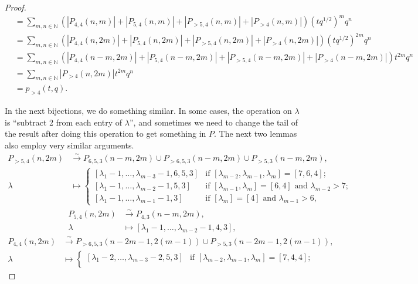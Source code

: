 \documentclass[a4paper, 12pt, reqno]{amsart}
\theoremstyle{remark}
\numberwithin{equation}{subsection}
\begin{document}
\begin{proof}
\begin{align*}
    &= \sum_{m, n \in \mathbb{N}}(|P_{4, 4}(n, m)| + |P_{5, 4}(n, m)| + |P_{>5, 4}(n, m)| + |P_{>4}(n, m)|)(tq^{1/2})^mq^n \\
    &= \sum_{m, n \in \mathbb{N}}(|P_{4, 4}(n, 2m)| + |P_{5, 4}(n, 2m)| + |P_{>5, 4}(n, 2m)| + |P_{>4}(n, 2m)|)(tq^{1/2})^{2m}q^n \\
    &= \sum_{m, n \in \mathbb{N}}(|P_{4, 4}(n - m, 2m)| + |P_{5, 4}(n - m, 2m)| + |P_{>5, 4}(n - m, 2m)| + |P_{>4}(n - m, 2m)|)t^{2m}q^n \\
    &= \sum_{m, n \in \mathbb{N}}|P_{>4}(n, 2m)|t^{2m}q^n \\
    &= p_{>4}(t, q).
  \end{align*}

  In the next bijections, we do something similar.
  In some cases, the operation on $\lambda$ is ``subtract 2 from each entry of $\lambda$'', and sometimes we need to change the tail of the result after doing this operation to get something in $P$.
  The next two lemmas also employ very similar arguments.
  \begin{align*}
    P_{>5, 4}(n, 2m) &\xrightarrow{\sim} P_{6, 5, 3}(n - m, 2m) \cup P_{>6, 5, 3}(n - m, 2m) \cup P_{>5, 3}(n - m, 2m), \\
    \lambda &\mapsto
              \begin{cases}
                [\lambda_1 - 1, \dots, \lambda_{m - 3} - 1, 6, 5, 3] &\text{if }[\lambda_{m - 2}, \lambda_{m - 1}, \lambda_m] = [7, 6, 4]; \\
                [\lambda_1 - 1, \dots, \lambda_{m - 2} - 1, 5, 3] &\text{if }[\lambda_{m - 1}, \lambda_m] = [6, 4]\text{ and }\lambda_{m - 2} > 7; \\
                [\lambda_1 - 1, \dots, \lambda_{m - 1} - 1, 3] &\text{if }[\lambda_m] = [4]\text{ and }\lambda_{m - 1} > 6,
              \end{cases}
  \end{align*}
  \begin{align*}
    P_{5, 4}(n, 2m) &\xrightarrow{\sim} P_{4, 3}(n - m, 2m), \\
    \lambda &\mapsto [\lambda_1 - 1, \dots, \lambda_{m - 2} - 1, 4, 3],
  \end{align*}
  \begin{align*}
    P_{4, 4}(n, 2m) &\xrightarrow{\sim} P_{>6, 5, 3}(n - 2m - 1, 2(m - 1)) \cup P_{>5, 3}(n - 2m - 1, 2(m - 1)), \\
    \lambda &\mapsto
              \begin{cases}
                [\lambda_1 - 2, \dots, \lambda_{m - 3} - 2, 5, 3] &\text{if }[\lambda_{m - 2}, \lambda_{m - 1}, \lambda_m] = [7, 4, 4]; \\

\end{cases}
\end{align*}
\end{proof}
\end{document}

